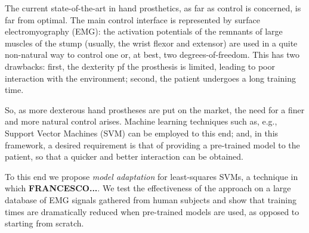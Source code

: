 The current state-of-the-art in hand prosthetics, as far as control is
concerned, is far from optimal. The main control interface is
represented by surface electromyography (EMG): the activation
potentials of the remnants of large muscles of the stump (usually, the
wrist flexor and extensor) are used in a quite non-natural way to
control one or, at best, two degrees-of-freedom. This has two
drawbacks: first, the dexterity pf the prosthesis is limited, leading
to poor interaction with the environment; second, the patient
undergoes a long training time.

So, as more dexterous hand prostheses are put on the market, the need
for a finer and more natural control arises. Machine learning
techniques such as, e.g., Support Vector Machines (SVM) can be
employed to this end; and, in this framework, a desired requirement is
that of providing a pre-trained model to the patient, so that a
quicker and better interaction can be obtained.

To this end we propose \emph{model adaptation} for least-squares SVMs,
a technique in which \textbf{FRANCESCO...}. We test the effectiveness
of the approach on a large database of EMG signals gathered from human
subjects and show that training times are dramatically reduced when
pre-trained models are used, as opposed to starting from scratch.
